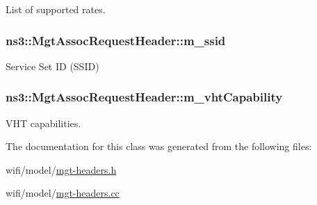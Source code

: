 List of supported rates. 

\subsubsection[{\texorpdfstring{m\+\_\+ssid}{m_ssid}}]{ ns3\+::\+Mgt\+Assoc\+Request\+Header\+::m\+\_\+ssid\hspace{0.3cm}{\ttfamily [private]}}\hypertarget{classns3_1_1MgtAssocRequestHeader_ac08bb2e24a653b5eea454497911a03f0}{}\label{classns3_1_1MgtAssocRequestHeader_ac08bb2e24a653b5eea454497911a03f0}


Service Set ID (S\+S\+ID) 

\subsubsection[{\texorpdfstring{m\+\_\+vht\+Capability}{m_vhtCapability}}]{ ns3\+::\+Mgt\+Assoc\+Request\+Header\+::m\+\_\+vht\+Capability\hspace{0.3cm}{\ttfamily [private]}}\hypertarget{classns3_1_1MgtAssocRequestHeader_a73ac2a31317dfef487416c10a87d028e}{}\label{classns3_1_1MgtAssocRequestHeader_a73ac2a31317dfef487416c10a87d028e}


V\+HT capabilities. 



The documentation for this class was generated from the following files\+:\begin{DoxyCompactItemize}
\item 
wifi/model/\hyperlink{mgt-headers_8h}{mgt-\/headers.\+h}\item 
wifi/model/\hyperlink{mgt-headers_8cc}{mgt-\/headers.\+cc}\end{DoxyCompactItemize}
